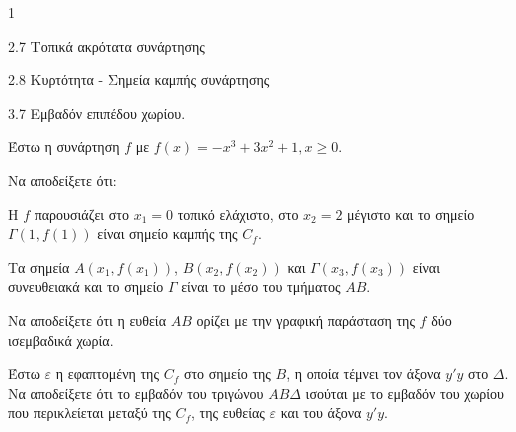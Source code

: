 \begin{ylh}{1}
    \item 2.7 Τοπικά ακρότατα συνάρτησης
    \item 2.8 Κυρτότητα - Σημεία καμπής συνάρτησης
    \item 3.7 Εμβαδόν επιπέδου χωρίου.
\end{ylh}
Έστω η συνάρτηση $f$ με $f(x) = -x^3 + 3x^2 + 1, x \geq 0$.
\begin{alist}
\item Να αποδείξετε ότι:
    \begin{rlist}
    \item Η $f$ παρουσιάζει στο $x_1 = 0$ τοπικό ελάχιστο, στο $x_2 = 2$ μέγιστο και το σημείο $\Gamma(1,f(1))$ είναι σημείο καμπής της $C_f$. 
    \item Τα σημεία $A(x_1,f(x_1))$, $B(x_2,f(x_2))$ και $\Gamma(x_3,f(x_3))$ είναι συνευθειακά και το σημείο $\Gamma$ είναι το μέσο του τμήματος $AB$. 
    \end{rlist}
\item Να αποδείξετε ότι η ευθεία $AB$ ορίζει με την γραφική παράσταση της $f$ δύο ισεμβαδικά χωρία. 
\item Έστω $\varepsilon$ η εφαπτομένη της $C_f$ στο σημείο της $B$, η οποία τέμνει τον άξονα $y'y$ στο $\Delta$. Να αποδείξετε ότι το εμβαδόν του τριγώνου $AB\Delta$ ισούται με το εμβαδόν του χωρίου που περικλείεται μεταξύ της $C_f$, της ευθείας $\varepsilon$ και του άξονα $y'y$. 
\end{alist}